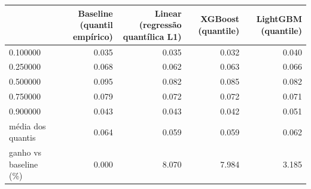 \begin{tabular}{lrrrr}
\toprule
 & Baseline (quantil empírico) & Linear (regressão quantílica L1) & XGBoost (quantile) & LightGBM (quantile) \\
\midrule
0.100000 & 0.035 & 0.035 & 0.032 & 0.040 \\
0.250000 & 0.068 & 0.062 & 0.063 & 0.066 \\
0.500000 & 0.095 & 0.082 & 0.085 & 0.082 \\
0.750000 & 0.079 & 0.072 & 0.072 & 0.071 \\
0.900000 & 0.043 & 0.043 & 0.042 & 0.051 \\
média dos quantis & 0.064 & 0.059 & 0.059 & 0.062 \\
ganho vs baseline (\%) & 0.000 & 8.070 & 7.984 & 3.185 \\
\bottomrule
\end{tabular}
